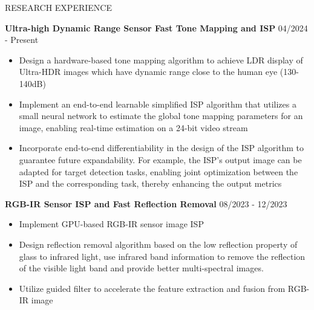 \documentclass{resume} %
\begin{document}
\begin{rSection}{RESEARCH EXPERIENCE}

\setlength{\parskip}{1.5pt}

\textbf{Ultra-high Dynamic Range Sensor Fast Tone Mapping and ISP} \hfill 04/2024 - Present
\begin{itemize}
    \setlength{\itemsep}{0pt}
    \setlength{\parsep}{0pt}
    \setlength{\parskip}{0pt}
    \item Design a hardware-based tone mapping algorithm to achieve LDR display of Ultra-HDR images which have dynamic range close to the human eye (130-140dB)
    \item Implement an end-to-end learnable simplified ISP algorithm that utilizes a small neural network to estimate the global tone mapping parameters for an image, enabling real-time estimation on a 24-bit video stream
    \item Incorporate end-to-end differentiability in the design of the ISP algorithm to guarantee future expandability. For example, the ISP's output image can be adapted for target detection tasks, enabling joint optimization between the ISP and the corresponding task, thereby enhancing the output metrics
\end{itemize}

\textbf{RGB-IR Sensor ISP and Fast Reflection Removal} \hfill 08/2023 - 12/2023
\begin{itemize}
    \setlength{\itemsep}{0pt}
    \setlength{\parsep}{0pt}
    \setlength{\parskip}{0pt}
    \item Implement GPU-based RGB-IR sensor image ISP
    \item Design reflection removal algorithm based on the low reflection property of glass to infrared light, use infrared band information to remove the reflection of the visible light band and provide better multi-spectral images.
    \item Utilize guided filter to accelerate the feature extraction and fusion from RGB-IR image
\end{itemize}

\end{rSection} 


\end{document}
